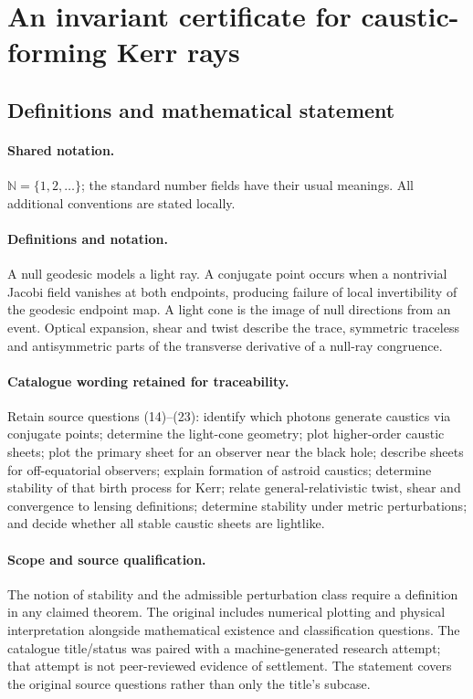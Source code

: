 \documentclass[11pt]{article}
\begin{document}
\section{An invariant certificate for caustic-forming Kerr rays}\label{statement}

\subsection{Definitions and mathematical statement}

\paragraph{Shared notation.}$\mathbb N=\{1,2,\ldots\}$; the standard number fields have their usual meanings. All additional conventions are stated locally.


\paragraph{Definitions and notation.}A null geodesic models a light ray. A conjugate point occurs when a nontrivial Jacobi field vanishes at both endpoints, producing failure of local invertibility of the geodesic endpoint map. A light cone is the image of null directions from an event. Optical expansion, shear and twist describe the trace, symmetric traceless and antisymmetric parts of the transverse derivative of a null-ray congruence.

\paragraph{Catalogue wording retained for traceability.}
Retain source questions (14)--(23): identify which photons generate caustics via conjugate points; determine the light-cone geometry; plot higher-order caustic sheets; plot the primary sheet for an observer near the black hole; describe sheets for off-equatorial observers; explain formation of astroid caustics; determine stability of that birth process for Kerr; relate general-relativistic twist, shear and convergence to lensing definitions; determine stability under metric perturbations; and decide whether all stable caustic sheets are lightlike.
\paragraph{Scope and source qualification.}The notion of stability and the admissible perturbation class require a definition in any claimed theorem. The original includes numerical plotting and physical interpretation alongside mathematical existence and classification questions. The catalogue title/status was paired with a machine-generated research attempt; that attempt is not peer-reviewed evidence of settlement. The statement covers the original source questions rather than only the title’s subcase.
\end{document}
